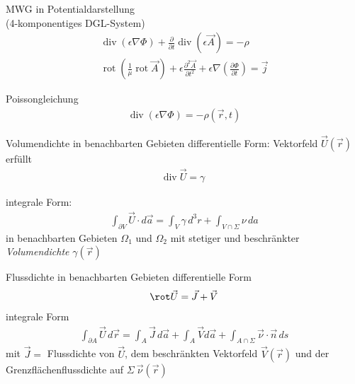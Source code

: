 \documentclass[a6paper]{kartei}
\renewcommand{\div}{\mathrm{div}\;}
\begin{document}
\begin{karte}{MWG in Potentialdarstellung \\(4-komponentiges DGL-System)}
 \begin{eqnarray*}
  \operatorname{div}(\epsilon \nabla \Phi) + \frac{\partial}{\partial t} \operatorname{div}(\epsilon \vec{A}) = - \rho \\
  \operatorname{rot}\left(\frac{1}{\mu} \operatorname{rot} \vec{A} \right) + \epsilon \frac{\partial^{2}\vec{A}}{\partial t^{2}} + \epsilon \nabla \left( \frac{\partial \Phi}{\partial t} \right) = \vec{j}
 \end{eqnarray*}
\end{karte}





\begin{karte}{Poissongleichung}
\begin{eqnarray*}
 \operatorname{div}(\epsilon \nabla \Phi) = - \rho(\vec{r},t)
\end{eqnarray*}
\end{karte}


\begin{karte}{Volumendichte in benachbarten Gebieten }differentielle Form:
Vektorfeld $\vec{U}(\vec{r})$ erfüllt
\begin{eqnarray*}
  \div \vec{U} = \gamma
 \end{eqnarray*}

integrale Form:
 \begin{eqnarray*}
  \int_{\partial V} \vec{U} \cdot d\vec{a} = \int_{V} \gamma \, d^{3}r + \int_{V \cap \Sigma} \nu \, da
 \end{eqnarray*} in benachbarten Gebieten $\Omega_{1}$ und $\Omega_{2}$ mit stetiger und beschränkter \\\emph{Volumendichte} $\gamma(\vec{r})$
\end{karte}



\begin{karte}{Flussdichte in benachbarten Gebieten }
 differentielle Form\begin{eqnarray*}
  \rot \vec{U} = \vec{J} + \vec{V}
 \end{eqnarray*}
integrale Form
 \begin{eqnarray*}
  \int_{\partial A} \vec{U} \, d\vec{r} = \int_{A} \vec{J} \, d\vec{a} + \int_{A} \vec{V} d\vec{a} + \int_{A \cap \Sigma} \vec{\nu} \cdot \vec{n} \, ds
 \end{eqnarray*}
 mit $\vec{J} = $ Flussdichte von $\vec{U}$, dem beschränkten Vektorfeld $\vec{V}(\vec{r})$ und der Grenzflächenflussdichte auf $\Sigma \ \vec{\nu}(\vec{r})$
\end{karte}
\end{document}
